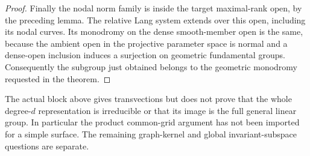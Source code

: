 \begin{proof}
Finally the nodal norm family is inside the target maximal-rank
open, by the preceding lemma. The relative Lang system extends
\etale over this open, including its nodal curves. Its monodromy
on the dense smooth-member open is the same, because the ambient
open in the projective parameter space is normal and a dense-open
inclusion induces a surjection on geometric fundamental groups.
Consequently the subgroup just obtained belongs to the geometric
monodromy requested in the theorem.
\end{proof}

\begin{remark}
\label{rem:nonordinary-odd-block-scope-candidate}
The actual block above gives transvections but does not prove that
the whole degree-$d$ representation is irreducible or that its image
is the full general linear group. In particular the product common-grid
argument has not been imported for a simple surface. The remaining
graph-kernel and global invariant-subspace questions are separate.
\end{remark}
